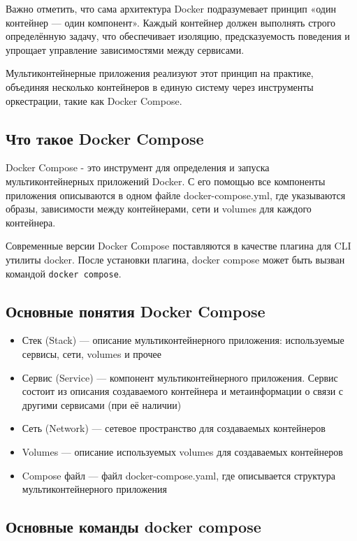 \documentclass[12pt,a4paper]{article}
\begin{document}
    Важно отметить, что сама архитектура Docker подразумевает принцип «один контейнер — один компонент».
    Каждый контейнер должен выполнять строго определённую задачу, что обеспечивает изоляцию, предсказуемость поведения
    и упрощает управление зависимостями между сервисами.

    Мультиконтейнерные приложения реализуют этот принцип на практике,
    объединяя несколько контейнеров в единую систему через инструменты оркестрации, такие как Docker Compose.

    \subsection{Что такое Docker Compose}

    Docker Compose - это инструмент для определения и запуска мультиконтейнерных приложений Docker. С его помощью все компоненты
    приложения описываются в одном файле docker-compose.yml, где указываются образы, зависимости между контейнерами, сети
    и volumes для каждого контейнера.

    Современные версии Docker Сompose поставляются в качестве плагина для CLI утилиты docker.
    После установки плагина, docker compose может быть вызван командой \lstinline|docker compose|.

    \subsection{Основные понятия Docker Compose}

    \begin{itemize}
        \item Стек (Stack) — описание мультиконтейнерного приложения: используемые сервисы, сети, volumes и прочее
        \item Сервис (Service) — компонент мультиконтейнерного приложения. Сервис состоит из описания создаваемого контейнера и метаинформации о связи с другими сервисами (при её наличии)
        \item Сеть (Network) — сетевое пространство для создаваемых контейнеров
        \item Volumes — описание используемых volumes для создаваемых контейнеров
        \item Compose файл — файл docker-compose.yaml, где описывается структура мультиконтейнерного приложения
    \end{itemize}

    \subsection{Основные команды docker compose}
\end{document}
